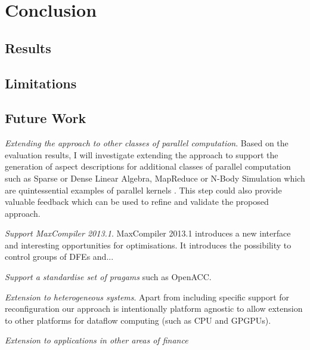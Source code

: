 \chapter{Conclusion}

\section{Results}

\section{Limitations}

\section{Future Work}

\emph{Extending the approach to other classes of parallel
  computation}.  Based on the evaluation results, I will investigate
extending the approach to support the generation of aspect
descriptions for additional classes of parallel computation such as
Sparse or Dense Linear Algebra, MapReduce or N-Body Simulation which
are quintessential examples of parallel kernels
\cite{Asanovic:Bodik:Catanzaro:Gebis:Husbands:Keutzer:Patterson:Plishker:Shalf:Williams:Yelick:2006}. This
step could also provide valuable feedback which can be used to refine
and validate the proposed approach.

\emph{Support MaxCompiler 2013.1}. MaxCompiler 2013.1 introduces a new
interface and interesting opportunities for optimisations. It
introduces the possibility to control groups of DFEs and...

\emph{Support a standardise set of pragams} such as OpenACC.

\emph{Extension to heterogeneous systems}. Apart from including
specific support for reconfiguration our approach is intentionally
platform agnostic to allow extension to other platforms for dataflow
computing (such as CPU and GPGPUs).

\emph{Extension to applications in other areas of finance}
